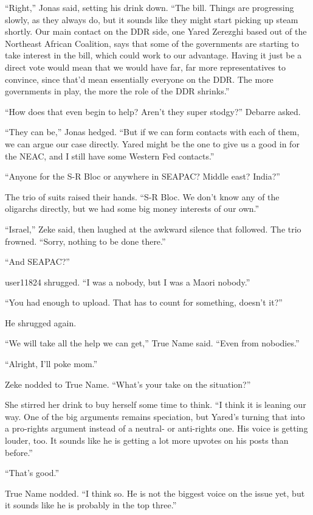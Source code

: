 ``Right,'' Jonas said, setting his drink down. ``The bill. Things are progressing slowly, as they always do, but it sounds like they might start picking up steam shortly. Our main contact on the DDR side, one Yared Zerezghi based out of the Northeast African Coalition, says that some of the governments are starting to take interest in the bill, which could work to our advantage. Having it just be a direct vote would mean that we would have far, far more representatives to convince, since that'd mean essentially everyone on the DDR. The more governments in play, the more the role of the DDR shrinks.''

``How does that even begin to help? Aren't they super stodgy?'' Debarre asked.

``They can be,'' Jonas hedged. ``But if we can form contacts with each of them, we can argue our case directly. Yared might be the one to give us a good in for the NEAC, and I still have some Western Fed contacts.''

``Anyone for the S-R Bloc or anywhere in SEAPAC? Middle east? India?''

The trio of suits raised their hands. ``S-R Bloc. We don't know any of the oligarchs directly, but we had some big money interests of our own.''

``Israel,'' Zeke said, then laughed at the awkward silence that followed. The trio frowned. ``Sorry, nothing to be done there.''

``And SEAPAC?''

user11824 shrugged. ``I was a nobody, but I was a Maori nobody.''

``You had enough to upload. That has to count for something, doesn't it?''

He shrugged again.

``We will take all the help we can get,'' True Name said. ``Even from nobodies.''

``Alright, I'll poke mom.''

Zeke nodded to True Name. ``What's your take on the situation?''

She stirred her drink to buy herself some time to think. ``I think it is leaning our way. One of the big arguments remains speciation, but Yared's turning that into a pro-rights argument instead of a neutral- or anti-rights one. His voice is getting louder, too. It sounds like he is getting a lot more upvotes on his posts than before.''

``That's good.''

True Name nodded. ``I think so. He is not the biggest voice on the issue yet, but it sounds like he is probably in the top three.''

